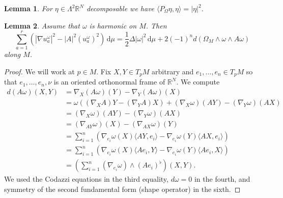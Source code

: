 \documentclass[10pt,a4paper]{amsart}
\newtheorem{lemma}{Lemma}
\newcommand{\R}{\mathbb{R}}
\newcommand{\bangle}[1]{\langle #1 \rangle}
\newcommand{\dvol}{\,\mathrm{d}\mu}%
\begin{document}
\begin{lemma}\label{lemm:P-decomp}
For $\eta \in \Lambda^2\R^N$ decomposable we have $\bangle{P_\Omega \eta,\eta} = |\eta|^2$. 
\end{lemma}

\begin{lemma}\label{lemm:sumQua-terms}
Assume that $\omega$ is harmonic on $M$. Then
\[
\sum_{a=1}^r \left(|\nabla u^\omega_a|^2 - |A|^2 (u_a^\omega)^2\right) \dvol = \frac 12 \Delta |\omega|^2 \dvol + 2 (-1)^n d( \Omega_M \wedge \omega \wedge A \omega)
\]
along $M$. 
\end{lemma}

\begin{proof}
We will work at $p\in M$. Fix $X,Y \in T_pM$ arbitrary and $e_1,\dots,e_n\in T_pM$ so that $e_1,\dots,e_n,\nu$ is an oriented orthonormal frame of $\R^N$. We compute 
\begin{equation}\label{eq:dAw-codazzi}
\begin{split}
d(A\omega)(X,Y) & = \nabla_{X}(A\omega)(Y) - \nabla_{Y}(A\omega)(X)\\
& = \omega((\nabla_{X}A) Y - (\nabla_{Y} A)X) + (\nabla_{X}\omega)(AY) - (\nabla_{Y}\omega)(AX)\\
& = (\nabla_{X}\omega)(AY) - (\nabla_{Y}\omega)(AX)\\
& = (\nabla_{AY}\omega)(X) - (\nabla_{AX}\omega)(Y)\\
& = \sum_{i=1}^n \left( \nabla_{e_i} \omega(X) \bangle{AY,e_i} - \nabla_{e_i} \omega(Y) \bangle{AX,e_i} \right)\\
& = \sum_{i=1}^n \left( \nabla_{e_i} \omega(X) \bangle{Ae_i,Y} - \nabla_{e_i} \omega(Y) \bangle{Ae_i,X}\right)\\
& = \left( \sum_{i=1}^n (\nabla_{e_i}\omega) \wedge (Ae_i)^\flat \right) (X,Y).
\end{split}
\end{equation}
We used the Codazzi equations in the third equality, $d\omega = 0$ in the fourth, and symmetry of the second fundamental form (shape operator) in the sixth. 


\end{proof}
\end{document}
